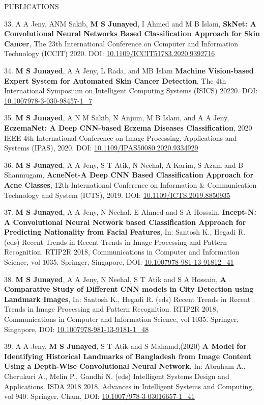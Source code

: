 \begin{rSection}{ PUBLICATIONS}
{{{{{{33. A A Jeny, ANM Sakib, {\bf M S Junayed}, I Ahmed and M B Islam, {\bf{SkNet: A Convolutional Neural Networks Based Classification Approach for Skin Cancer}}, The 23th International Conference on Computer and Information Technology (ICCIT) 2020. DOI: {\href{https://ieeexplore.ieee.org/document/9392716}{10.1109/ICCIT51783.2020.9392716}}}

{34.  {\bf M S Junayed}, A A Jeny, L Rada, and MB Islam {\bf{Machine Vision-based Expert System for Automated Skin Cancer Detection}}, The 4th International Symposium on Intelligent Computing Systems (ISICS) 20220. DOI: {\href{https://link.springer.com/chapter/10.1007/978-3-030-98457-1_7}{10.1007\/978-3-030-98457-1\_7}}}

{35. {\bf M S Junayed}, A N M Sakib, N Anjum, M B Islam, and A A Jeny, {\bf{EczemaNet: A Deep CNN-based Eczema Diseases Classification}}, 2020 IEEE 4th International Conference on Image Processing, Applications and Systems (IPAS), 2020. DOI: {\href{https://ieeexplore.ieee.org/document/9334929}{10.1109/IPAS50080.2020.9334929}}}

{36. {\bf M S Junayed}, A A Jeny, S T Atik, N Neehal, A Karim, S Azam and B Shanmugam, {\bf{AcneNet-A Deep CNN Based Classification Approach for Acne Classes}}, 12th International Conference on Information \& Communication Technology and System (ICTS), 2019. DOI: {\href{https://ieeexplore.ieee.org/document/8850935}{10.1109/ICTS.2019.8850935}}}

{37. {\bf M S Junayed}, A A Jeny, N Neehal, E Ahmed and S A Hossain, {\bf{Incept-N: A Convolutional Neural Network based Classification Approach for Predicting Nationality from Facial Features}}, In: Santosh K., Hegadi R. (eds) Recent Trends in Recent Trends in Image Processing and Pattern Recognition. RTIP2R 2018, Communications in Computer and Information Science, vol 1035. Springer, Singapore, DOI: {\href{https://link.springer.com/chapter/10.1007/978-981-13-9184-2_41}{10.1007\/978-981-13-91812\_41}}}

{38. {\bf M S Junayed}, A A Jeny, N Neehal, S T Atik and S A Hossain, {\bf{A Comparative Study of  Diﬀerent CNN models in City Detection using Landmark Images}}, In: Santosh K., Hegadi R. (eds) Recent Trends in Recent Trends in Image Processing and Pattern Recognition. RTIP2R 2018, Communications in Computer and Information Science, vol 1035. Springer, Singapore, DOI: {\href{https://link.springer.com/chapter/10.1007/978-981-13-9181-1_48}{10.1007\/978-981-13-9181-1\_48}}}

{39. A A Jeny, {\bf M S Junayed}, S T Atik and S Mahamd,(2020) {\bf{A Model for Identifying Historical Landmarks of Bangladesh from Image Content Using a Depth-Wise Convolutional Neural Network}}, In: Abraham A., Cherukuri A., Melin P., Gandhi N. (eds) Intelligent Systems Design and Applications. ISDA 2018 2018. Advances in Intelligent Systems and Computing, vol 940. Springer, Cham, DOI: {\href{https://link.springer.com/chapter/10.1007/978-3-030-16657-1_41}{10.1007/978-3-03016657-1\_41}}}
 
}}}}}
\end{rSection}
